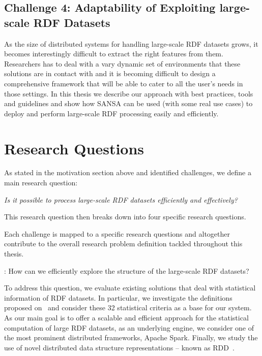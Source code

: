 \subsection{Challenge 4: Adaptability of Exploiting large-scale RDF Datasets}
As the size of distributed systems for handling large-scale RDF datasets grows, it becomes interestingly difficult to extract the right features from them.
Researchers has to deal with a vary dynamic set of environments that these solutions are in contact with and it is becoming difficult to design a comprehensive framework that will be able to cater to all the user's needs in those settings.
In this thesis we describe our approach with best practices, tools and guidelines and show how SANSA can be used (with some real use cases) to deploy and perform large-scale RDF processing easily and efficiently.


\section{Research Questions}
\label{sec:research-questions}

As stated in the motivation section above and identified challenges, we define a main research question:

\begin{tcolorbox}
\centering
\textit{Is it possible to process large-scale RDF datasets efficiently and effectively?}
\end{tcolorbox}

This research question then breaks down into four specific research questions.

Each challenge is mapped to a specific research questions and altogether contribute to the overall research problem definition tackled throughout this thesis.

\begin{tcolorbox}
\textbf{\rqNr[RQ1]\label{rq:1}}: How can we efficiently explore the structure of the large-scale RDF datasets?
\end{tcolorbox}

To address this question, we evaluate existing solutions that deal with statistical information of RDF datasets.
In particular, we investigate the definitions proposed on~\cite{demter-2012-ekaw} and consider these 32 statistical criteria as a base for our system.
As our main goal is to offer a scalable and efficient approach for the statistical computation of large RDF datasets, as an underlying engine, we consider one of the most prominent distributed frameworks, Apache Spark.
Finally, we study the use of novel distributed data structure representations -- known as \gls{RDD}~\cite{zaharia2012resilient}.

